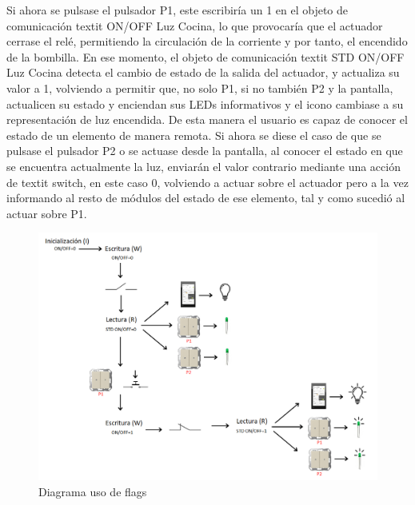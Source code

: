 Si ahora se pulsase el pulsador P1, este escribiría un 1 en el objeto de comunicación textit {ON/OFF Luz Cocina}, lo que provocaría que el actuador cerrase el relé, permitiendo la circulación de la corriente y por tanto, el encendido de la bombilla. En ese momento, el objeto de comunicación textit {STD ON/OFF Luz Cocina} detecta el cambio de estado de la salida del actuador, y actualiza su valor a 1, volviendo a permitir que, no solo P1, si no también P2 y la pantalla, actualicen su estado y enciendan sus LEDs informativos y el icono cambiase a su representación de luz encendida. De esta manera el usuario es capaz de conocer el estado de un elemento de manera remota. Si ahora se diese el caso de que se pulsase el pulsador P2 o se actuase desde la pantalla, al conocer el estado en que se encuentra actualmente la luz, enviarán el valor contrario mediante una acción de textit {switch}, en este caso 0, volviendo a actuar sobre el actuador pero a la vez informando al resto de módulos del estado de ese elemento, tal y como sucedió al actuar sobre P1.
 \begin{center}
\begin{figure}[H]
\includegraphics[width=1\textwidth]{figures/diag_flags.png}   
\caption{Diagrama uso de flags}
\label{fig:diag_flags}
\end{figure}
\end{center}
